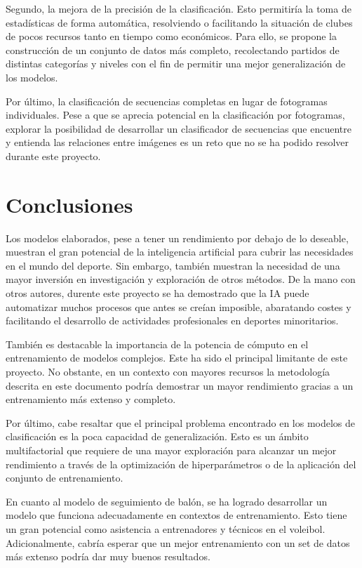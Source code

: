 \documentclass[12pt]{report} %
\begin{document}
    Segundo, la mejora de la precisión de la clasificación. Esto permitiría la
    toma de estadísticas de forma automática, resolviendo o facilitando la
    situación de clubes de pocos recursos tanto en tiempo como económicos. Para
    ello, se propone la construcción de un conjunto de datos más completo,
    recolectando partidos de distintas categorías y niveles con el fin de
    permitir una mejor generalización de los modelos.

    Por último, la clasificación de secuencias completas en lugar de fotogramas
    individuales. Pese a que se aprecia potencial en la clasificación por
    fotogramas, explorar la posibilidad de desarrollar un clasificador de
    secuencias que encuentre y entienda las relaciones entre imágenes es un
    reto que no se ha podido resolver durante este proyecto.
    

    \chapter{Conclusiones}
    \label{chap:conclusion}

    Los modelos elaborados, pese a tener un rendimiento por debajo de lo deseable, muestran el gran potencial de la inteligencia artificial para cubrir las necesidades en el mundo del deporte. Sin embargo, también muestran la necesidad de una mayor inversión en investigación y exploración de otros métodos. De la mano con otros autores, durente este proyecto se ha demostrado que la IA puede automatizar muchos procesos que antes se creían imposible, abaratando costes y facilitando el desarrollo de actividades profesionales en deportes minoritarios. 

    También es destacable la importancia de la potencia de cómputo en el entrenamiento de modelos complejos. Este ha sido el principal limitante de este proyecto. No obstante, en un contexto con mayores recursos la metodología descrita en este documento podría demostrar un mayor rendimiento gracias a un entrenamiento más extenso y completo.

    Por último, cabe resaltar que el principal problema encontrado en los modelos de clasificación es la poca capacidad de generalización. Esto es un ámbito multifactorial que requiere de una mayor exploración para alcanzar un mejor rendimiento a través de la optimización de hiperparámetros o de la aplicación del conjunto de entrenamiento.

    En cuanto al modelo de seguimiento de balón, se ha logrado desarrollar un modelo que funciona adecuadamente en contextos de entrenamiento. Esto tiene un gran potencial como asistencia a entrenadores y técnicos en el voleibol. Adicionalmente, cabría esperar que un mejor entrenamiento con un set de datos más extenso podría dar muy buenos resultados.
\end{document}
